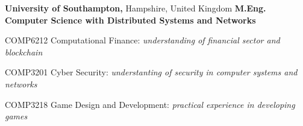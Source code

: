 
\smallskip
{}%
\textbf{University of Southampton,} Hampshire, United Kingdom \newline
\textbf{M.Eng. Computer Science with Distributed Systems and Networks} 
\begin{itemize*}
  \item COMP6212 Computational Finance: \emph{understanding of financial sector and blockchain}
  \item COMP3201 Cyber Security: \emph{understanting of security in computer systems and networks}
  \item COMP3218 Game Design and Development: \emph{practical experience in developing games}
\end{itemize*}
